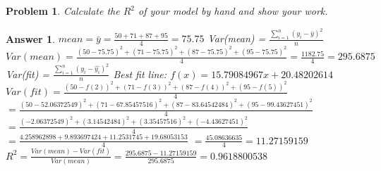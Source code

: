 \documentclass[11pt]{article}
\theoremstyle{description}
\newtheorem{problem}{Problem}
\theoremstyle{break}
\newtheorem*{answer}{Answer}
\begin{document}
    \begin{problem}
        Calculate the $R^2$ of your model by hand and show your work.
    \end{problem}
    \begin{answer}
        $mean = \bar{y} = \frac{50 + 71 + 87 + 95}{4} = 75.75$\newline
        Var(mean) = $\frac{\sum_{i=1}^{n} (y_i - \bar{y})^2}{n}$\newline
        $Var(mean) = \frac{(50 - 75.75)^2 + (71 - 75.75)^2 + (87 - 75.75)^2 + (95 - 75.75)^2}{4} = \frac{1182.75}{4} = 295.6875$\newline
        Var(fit) = $\frac{\sum_{i=1}^{n} (y_i - \hat{y_i})^2}{n}$\newline
        Best fit line: $f(x) = 15.79084967x + 20.48202614$\newline
        $Var(fit) = \frac{(50 - f(2))^2 + (71 - f(3))^2 + (87 - f(4))^2 + (95 - f(5))^2}{4}$\newline
        $= \frac{(50 - 52.06372549)^2 + (71 - 67.85457516)^2 + (87 - 83.64542484)^2 + (95 - 99
        .43627451)^2}{4}$\newline
        $= \frac{(-2.06372549)^2 + (3.14542484)^2 + (3.35457516)^2 + (-4.43627451)^2}{4}$\newline
        $= \frac{4.258962898 + 9.893697424 + 11.2531745 + 19.68053153}{4}$\newline
        $= \frac{45.08636635}{4} = 11.27159159$\newline
        $R^2 = \frac{Var(mean) - Var(fit)}{Var(mean)} = \frac{295.6875 - 11.27159159}{295.6875} = 0.9618800538$
    \end{answer}
\end{document}
